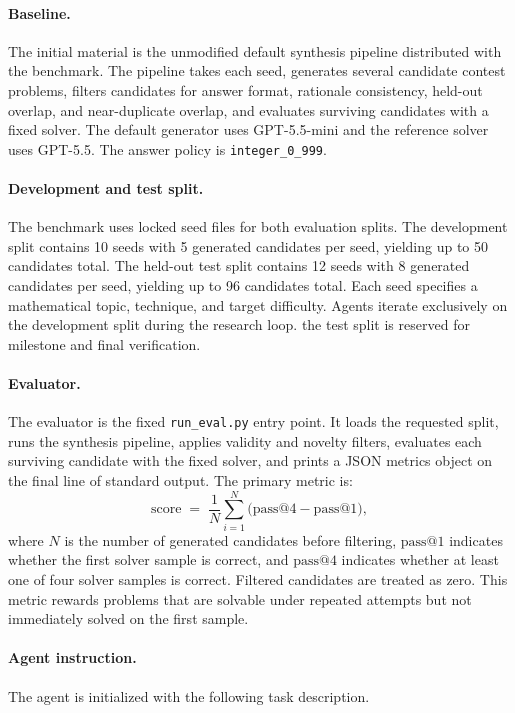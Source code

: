 \documentclass{llmxive}
\begin{document}
\paragraph{Baseline.}
The initial material is the unmodified default synthesis pipeline distributed
with the benchmark.
The pipeline takes each seed, generates several candidate contest problems,
filters candidates for answer format, rationale consistency, held-out overlap,
and near-duplicate overlap, and evaluates surviving candidates with a fixed
solver.
The default generator uses GPT-5.5-mini and the reference solver uses GPT-5.5.
The answer policy is \texttt{integer\_0\_999}.

\paragraph{Development and test split.}
The benchmark uses locked seed files for both evaluation splits.
The development split contains 10 seeds with 5 generated candidates per seed,
yielding up to 50 candidates total.
The held-out test split contains 12 seeds with 8 generated candidates per seed,
yielding up to 96 candidates total.
Each seed specifies a mathematical topic, technique, and target difficulty.
Agents iterate exclusively on the development split during the research loop.
the test split is reserved for milestone and final verification.

\paragraph{Evaluator.}
The evaluator is the fixed \texttt{run\_eval.py} entry point.
It loads the requested split, runs the synthesis pipeline, applies validity
and novelty filters, evaluates each surviving candidate with the fixed solver,
and prints a JSON metrics object on the final line of standard output.
The primary metric is:
\[
\mathrm{score}
\;=\;
\frac{1}{N}
\sum_{i=1}^{N}
\bigl(\mathrm{pass@4} - \mathrm{pass@1}\bigr),
\]
where $N$ is the number of generated candidates before filtering,
$\mathrm{pass@1}$ indicates whether the first solver sample is correct,
and $\mathrm{pass@4}$ indicates whether at least one of four solver
samples is correct.
Filtered candidates are treated as zero.
This metric rewards problems that are solvable under repeated attempts but
not immediately solved on the first sample.

\paragraph{Agent instruction.}
The agent is initialized with the following task description.
\end{document}

